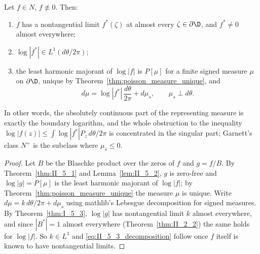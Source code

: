 \begin{theorem}
  \label{thm:II_5_3}
  \leanok
  \mainline
  Let $f\in N$, $f\not\equiv0$. Then:
  \begin{enumerate}
    \item $f$ has a nontangential limit $f^*(\zeta)$ at almost every
      $\zeta\in\partial\D$, and $f^*\ne0$ almost everywhere;
    \item $\log|f^*|\in L^1(d\theta/2\pi)$;
    \item the least harmonic majorant of $\log|f|$ is $P[\mu]$ for a finite
      signed measure $\mu$ on $\partial\D$, unique by
      Theorem~\ref{thm:poisson_measure_unique}, and
      \begin{equation}
        \label{eq:II_5_3_decomposition}
        d\mu=\log|f^*|\,\frac{d\theta}{2\pi}+d\mu_s,
        \qquad \mu_s\perp d\theta .
      \end{equation}
  \end{enumerate}
  In other words, the absolutely continuous part of the representing measure
  is exactly the boundary logarithm, and the whole obstruction to the
  inequality $\log|f(z)|\le\int\log|f^*|P_z\,d\theta/2\pi$ is concentrated in
  the singular part; Garnett's class $N^+$ is the subclass where
  $\mu_s\le0$.
  \begin{proof}
    \notready
    Let $B$ be the Blaschke product over the zeros of $f$ and $g=f/B$. By
    Theorem~\ref{thm:II_5_1} and Lemma~\ref{lem:II_5_2}, $g$ is zero-free and
    $\log|g|=P[\mu]$ is the least harmonic majorant of $\log|f|$; by
    Theorem~\ref{thm:poisson_measure_unique} the measure $\mu$ is unique. Write
    $d\mu=k\,d\theta/2\pi+d\mu_s$ using mathlib's Lebesgue decomposition
    for signed measures. By
    Theorem~\ref{thm:I_5_3}, $\log|g|$ has nontangential limit $k$ almost
    everywhere, and since $|B^*|=1$ almost everywhere
    (Theorem~\ref{thm:II_2_2}) the same holds for $\log|f|$. So $k\in L^1$ and
    \eqref{eq:II_5_3_decomposition} follow once $f$ itself is known to have
    nontangential limits.


\end{proof}
\end{theorem}
